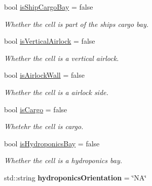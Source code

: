 \begin{DoxyCompactItemize}
\mbox{\label{class_cell_a0cc30157bc1bde69b8e5cbaab05038f5}} 
bool \hyperlink{class_cell_a0cc30157bc1bde69b8e5cbaab05038f5}{is\+Ship\+Cargo\+Bay} = false
\begin{DoxyCompactList}\small\item\em Whether the cell is part of the ships cargo bay. \end{DoxyCompactList}\item 
\mbox{\label{class_cell_a1b083abd6436982134aebcbce16d6241}} 
bool \hyperlink{class_cell_a1b083abd6436982134aebcbce16d6241}{is\+Vertical\+Airlock} = false
\begin{DoxyCompactList}\small\item\em Whether the cell is a vertical airlock. \end{DoxyCompactList}\item 
\mbox{\label{class_cell_a9f3ad57a5595ca4fa50f088f8bbab832}} 
bool \hyperlink{class_cell_a9f3ad57a5595ca4fa50f088f8bbab832}{is\+Airlock\+Wall} = false
\begin{DoxyCompactList}\small\item\em Whether the cell is a airlock side. \end{DoxyCompactList}\item 
\mbox{\label{class_cell_af25186ff716665d0ca7fdc38a8672253}} 
bool \hyperlink{class_cell_af25186ff716665d0ca7fdc38a8672253}{is\+Cargo} = false
\begin{DoxyCompactList}\small\item\em Whetehr the cell is cargo. \end{DoxyCompactList}\item 
\mbox{\label{class_cell_a6b1c886b18165fa9eb8282ab50a514d6}} 
bool \hyperlink{class_cell_a6b1c886b18165fa9eb8282ab50a514d6}{is\+Hydroponics\+Bay} = false
\begin{DoxyCompactList}\small\item\em Whether the cell is a hydroponics bay. \end{DoxyCompactList}\item 
\mbox{\label{class_cell_ac9ff663273f018a96d2ab9a727fc8a5c}} 
std\+::string {\bfseries hydroponics\+Orientation} = \char`\"{}NA\char`\"{}
\item 

\end{DoxyCompactItemize}
